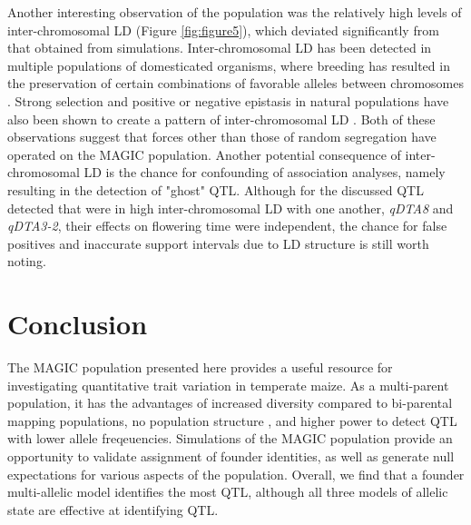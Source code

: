 \documentclass[article,9pt,twocolumn,twoside]{rilabRxiv}
\begin{document}
Another interesting observation of the population was the relatively high levels of inter-chromosomal LD (Figure \ref{fig:figure5}), which deviated significantly from that obtained from simulations.
Inter-chromosomal LD has been detected in multiple populations of domesticated organisms, where breeding has resulted in the preservation of certain combinations of favorable alleles between chromosomes \citep{Robbins,MalyshevaOtto}.
Strong selection and positive or negative epistasis in natural populations have also been shown to create a pattern of inter-chromosomal LD \citep{Kulminski,Gupta,Hench,Petkov}.
Both of these observations suggest that forces other than those of random segregation have operated on the MAGIC population.
Another potential consequence of inter-chromosomal LD is the chance for confounding of association analyses, namely resulting in the detection of "ghost" QTL.
Although for the discussed QTL detected that were in high inter-chromosomal LD with one another, \emph{qDTA8} and \emph{qDTA3-2}, their effects on flowering time were independent, the chance for false positives and inaccurate support intervals due to LD structure is still worth noting.

\section{Conclusion}
The MAGIC population presented here provides a useful resource for investigating quantitative trait variation in temperate maize.
As a multi-parent population, it has the advantages of increased diversity compared to bi-parental mapping populations, no population structure , and higher power to detect QTL with lower allele freqeuencies.
Simulations of the MAGIC population provide an opportunity to validate assignment of founder identities, as well as generate null expectations for various aspects of the population.
Overall, we find that a founder multi-allelic model identifies the most QTL, although all three models of allelic state are effective at identifying QTL.
\end{document}
